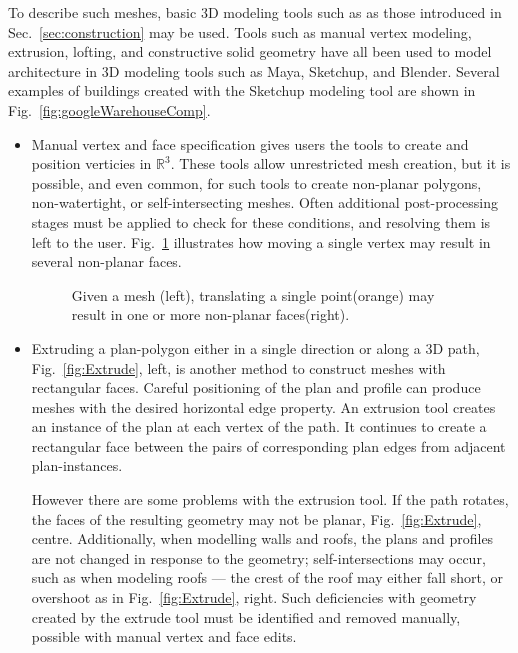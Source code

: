 To describe such meshes, basic 3D modeling tools such as as those introduced in Sec.~\ref{sec:construction} may be used. Tools such as manual vertex modeling, extrusion, lofting, and constructive solid geometry have all been used to model architecture in 3D modeling tools such as Maya\cite{Maya}, Sketchup\cite{Sketchup}, and Blender\cite{Blender}. Several examples of buildings created with the Sketchup modeling tool are shown in Fig.~\ref{fig:googleWarehouseComp}.


\begin{itemize}

\item{Manual vertex and face specification gives users the tools to create and position verticies in $\mathbb{R}^3$. These tools allow unrestricted mesh creation, but it is possible, and even common, for such tools to create non-planar polygons, non-watertight, or self-intersecting meshes. Often additional post-processing stages must be applied to check for these conditions, and resolving them is left to the user. Fig.~\ref{fig:vertex_edit} illustrates how moving a single vertex may result in several non-planar faces.}

\begin{figure}
  \centering
  \def\svgwidth{0.7\columnwidth}
  
  \caption[Mesh editing may not preserve face planarity.]{\label{fig:vertex_edit}Given a mesh (left), translating a single point(orange) may result in one or more non-planar faces(right).}
\end{figure}

\item{Extruding a plan-polygon either in a single direction or along a 3D path, Fig.~\ref{fig:Extrude}, left, is another method to construct meshes with rectangular faces. Careful positioning of the plan and profile can produce meshes with the desired horizontal edge property. An extrusion tool creates an instance of the plan at each vertex of the path. It continues to create a rectangular face between the pairs of corresponding plan edges from adjacent plan-instances. 

However there are some problems with the extrusion tool. If the path rotates, the faces of the resulting geometry may not be planar, Fig.~\ref{fig:Extrude}, centre. Additionally, when modelling walls and roofs, the plans and profiles are not changed in response to the geometry; self-intersections may occur, such as when modeling roofs --- the crest of the roof may either fall short, or overshoot as in Fig.~\ref{fig:Extrude}, right. Such deficiencies with geometry created by the extrude tool must be identified and removed manually, possible with manual vertex and face edits.

}
\end{itemize}
